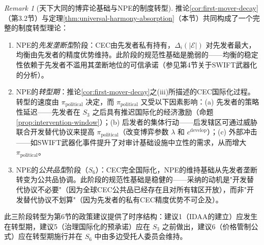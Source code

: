 \documentclass[12pt,a4paper]{ctexart}
\theoremstyle{definition}
\theoremstyle{remark}
\newtheorem{remark}{Remark}[section]
\begin{document}
\begin{remark}[天下大同的博弈论基础与NPE的制度转型]
推论\ref{cor:first-mover-decay}（第3.2节）与定理\ref{thm:universal-harmony-absorption}（本节）共同构成了一个完整的制度转型理论：

\begin{enumerate}[label=(\arabic*), leftmargin=*]
\item NPE的\textit{先发垄断型}阶段：CEC由先发者私有持有，$\Delta_i(|\mathcal{E}|)$ 对先发者最大，均衡由先发者的精度优势维持。此阶段的规范性基础是脆弱的——均衡的稳定性依赖于先发者不滥用其垄断地位的可信承诺（参见第4节关于SWIFT武器化的分析）。

\item NPE的\textit{转型期}：推论\ref{cor:first-mover-decay}之(iii)所描述的CEC国际化过程。转型的速度由 $\pi_{\text{political}}$ 决定，而 $\pi_{\text{political}}$ 又受以下因素影响：(a) 先发者的策略性延迟——先发者在 $S_3$ 之后具有推迟国际化的经济激励（命题\ref{prop:intervention-window}）；(b) 后发者的集体行动——后发辖区可通过威胁联合开发替代协议来提高 $\pi_{\text{political}}$（改变博弈参数 $\lambda$ 和 $c^{\text{develop}}$）；(c) 外部冲击——如SWIFT武器化事件提升了对审计基础设施中立性的需求，从而增大 $\pi_{\text{political}}$。

\item NPE的\textit{公共品型}阶段（$S_6$）：CEC完全国际化，NPE的维持基础从先发者垄断转变为公共品协调。此阶段的规范性基础是稳健的——采纳的动机是"开发替代协议不必要"（因为全球CEC公共品已经存在且对所有辖区开放），而非"开发替代协议不划算"（因为先发者的私有CEC精度优势不可企及）。
\end{enumerate}

此三阶段转型为第6节的政策建议提供了时序结构：建议1（IDAA的建立）应发生在转型期，建议5（治理国际化的预承诺）应在 $S_3$ 之前做出，建议6（价格管制公式）应在转型期施行并在 $S_6$ 中由多边受托人委员会维持。
\end{remark}
\end{document}
